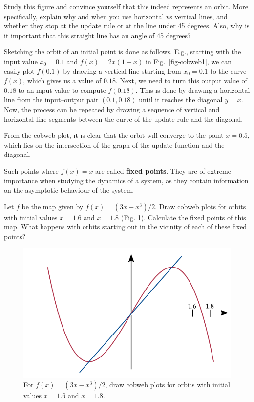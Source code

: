 \begin{cue}
Study this figure and convince yourself that this indeed represents an orbit. More specifically, explain why and when you use horizontal vs vertical lines, and whether they stop at the update rule or at the line under 45 degrees. Also, why is it important that this straight line has an angle of 45 degrees?
\end{cue}

Sketching the orbit of an initial point is done as follows. E.g., starting with the input value $x_0=0.1$ and $f(x)=2x(1-x)$ in Fig.~\ref{fig-cobweb1}, we can easily plot $f(0.1)$ by drawing a vertical line starting from $x_0=0.1$ to the curve $f(x)$, which gives us a value of $0.18$. Next, we need to turn this output value of $0.18$ to an input value to compute $f(0.18)$. This is done by drawing a horizontal line from the input--output pair $(0.1,0.18)$ until it reaches the diagonal $y=x$. Now, the process can be repeated by drawing a sequence of vertical and horizontal line segments between the curve of the update rule and the diagonal.

From the cobweb plot, it is clear that the orbit will converge to the point $x=0.5$, which lies on the intersection of the graph of the update function and the diagonal.

Such points where $f(x)=x$ are called \textbf{fixed points}. They are of extreme importance when studying the dynamics of a system, as they contain information on the asymptotic behaviour of the system.

\begin{exer}
Let $f$ be the map given by $f(x) = (3x-x^3)/2$. Draw cobweb plots for orbits with initial values $x=1.6$ and $x=1.8$ (Fig. \ref{fig-cobweb-ex}). Calculate the fixed points of this map. What happens with orbits starting out in the vicinity of each of these fixed points?
\end{exer}

\begin{figure}
\centering
\includegraphics{dynamic/figures/cobweb_ex}
\caption{For $f(x) = (3x-x^3)/2$, draw cobweb plots for orbits with initial values $x=1.6$ and $x=1.8$.}
\label{fig-cobweb-ex}
\end{figure} 


